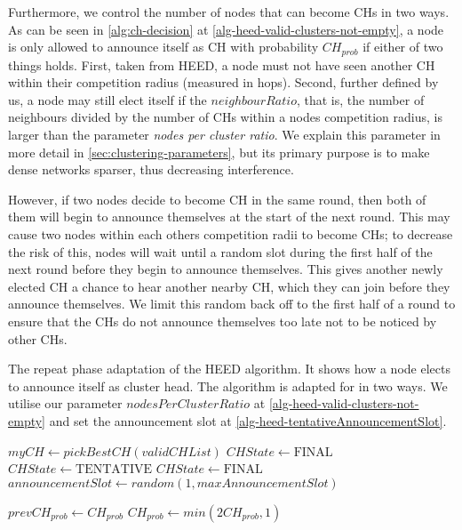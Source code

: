 Furthermore, we control the number of nodes that can become CHs in two ways. As can be seen in \cref{alg:ch-decision} at \cref{alg-heed-valid-clusters-not-empty}, a node is only allowed to announce itself as CH with probability $CH_{prob}$ if either of two things holds. First, taken from HEED, a node must not have seen another CH within their competition radius (measured in hops). Second, further defined by us, a node may still elect itself if the $neighbourRatio$, that is, the number of neighbours divided by the number of CHs within a nodes competition radius, is larger than the parameter \emph{nodes per cluster ratio}. We explain this parameter in more detail in \cref{sec:clustering-parameters}, but its primary purpose is to make dense networks sparser, thus decreasing interference.

However, if two nodes decide to become CH in the same round, then both of them will begin to announce themselves at the start of the next round. This may cause two nodes within each others competition radii to become CHs; to decrease the risk of this, nodes will wait until a random slot during the first half of the next round before they begin to announce themselves. This gives another newly elected CH a chance to hear another nearby CH, which they can join before they announce themselves. We limit this random back off to the first half of a round to ensure that the CHs do not announce themselves too late not to be noticed by other CHs.

\begin{algorithm}[bt]
\caption{The repeat phase adaptation of the HEED algorithm. It shows how a node elects to announce itself as cluster head. The algorithm is adapted for \atwo{} in two ways. We utilise our parameter $nodesPerClusterRatio$ at \cref{alg-heed-valid-clusters-not-empty} and set the announcement slot at \cref{alg-heed-tentativeAnnouncementSlot}.}
\label{alg:ch-decision}
\begin{algorithmic}[1]
     \label{alg-heed-valid-clusters-not-empty}
        \State $myCH \gets pickBestCH(validCHList)$
                \State $CHState \gets \text{FINAL}$
            \Else
                \State $CHState \gets \text{TENTATIVE}$
            \EndIf
        \EndIf
        \State $CHState \gets \text{FINAL}$
        \State $announcementSlot \gets random(1, maxAnnouncementSlot)$ \label{alg-heed-tentativeAnnouncementSlot}
    \EndIf
    
    \State $prevCH_{prob} \gets CH_{prob}$
    \State $CH_{prob} \gets min(2CH_{prob},1)$
\EndIf
\EndProcedure
\end{algorithmic}
\end{algorithm}

